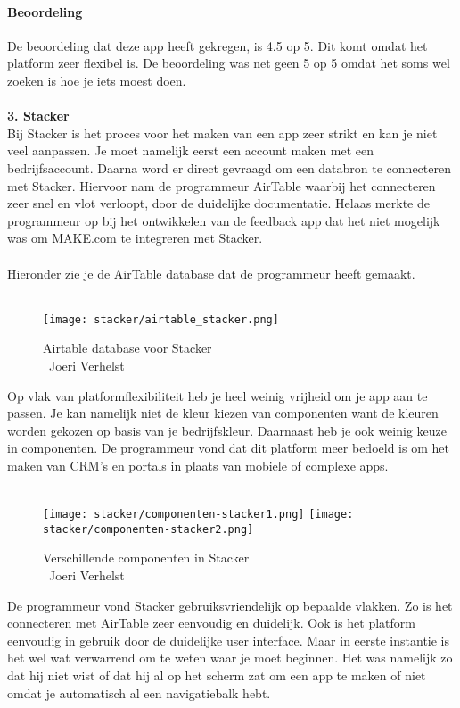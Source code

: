 \paragraph*{Beoordeling}
De beoordeling dat deze app heeft gekregen, is 4.5 op 5. Dit komt omdat het platform zeer flexibel is. 
De beoordeling was net geen 5 op 5 omdat het soms wel zoeken is hoe je iets moest doen.
\\
\\
\textbf{3. Stacker}
\\
Bij Stacker is het proces voor het maken van een app zeer strikt en kan je niet veel aanpassen. Je moet namelijk eerst een account maken met een bedrijfsaccount.
Daarna word er direct gevraagd om een databron te connecteren met Stacker. Hiervoor nam de programmeur AirTable waarbij het connecteren zeer snel en vlot verloopt, door de duidelijke documentatie.
Helaas merkte de programmeur op bij het ontwikkelen van de feedback app dat het niet mogelijk was om MAKE.com te integreren met Stacker.
\\
\\
Hieronder zie je de AirTable database dat de programmeur heeft gemaakt.
\\
\\
\begin{figure}[H]
    \texttt{[image: stacker/airtable\_stacker.png]}
    \caption[Airtable database voor Stacker]{Airtable database voor Stacker\\\textcopyright\ Joeri Verhelst}
    \label{fig:airtable-stacker}
\end{figure}
Op vlak van platformflexibiliteit heb je heel weinig vrijheid om je app aan te passen. Je kan namelijk niet de kleur kiezen van componenten want de kleuren worden gekozen
op basis van je bedrijfskleur. Daarnaast heb je ook weinig keuze in componenten. De programmeur vond dat dit platform meer bedoeld is om het maken van CRM's en portals in plaats van 
mobiele of complexe apps.
\\
\\

\begin{figure}[H]
    \texttt{[image: stacker/componenten-stacker1.png]}
    \texttt{[image: stacker/componenten-stacker2.png]}
    \caption[Verschillende componenten in Stacker]{Verschillende componenten in Stacker\\\textcopyright\ Joeri Verhelst}
    \label{fig:componenten-stacker}
\end{figure}
De programmeur vond Stacker gebruiksvriendelijk op bepaalde vlakken. Zo is het connecteren met AirTable zeer eenvoudig en duidelijk.
Ook is het platform eenvoudig in gebruik door de duidelijke user interface. Maar in eerste instantie is het wel wat verwarrend om te weten waar je moet beginnen.
Het was namelijk zo dat hij niet wist of dat hij al op het scherm zat om een app te maken of niet omdat je automatisch al een navigatiebalk hebt.
\\
\\

